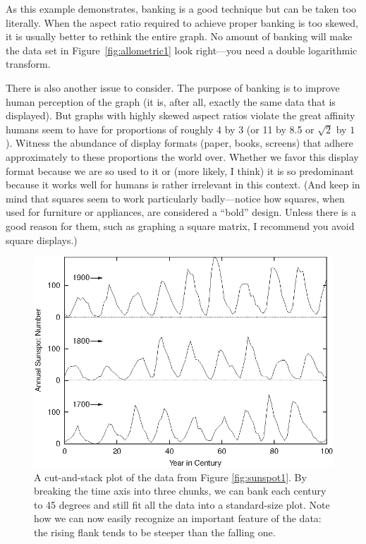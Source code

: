 As this example demonstrates, banking is a good technique but can be
taken too literally. When the aspect ratio required to achieve proper
banking is too skewed, it is usually better to rethink the entire
graph. No amount of banking will make the data set in 
Figure~\ref{fig:allometric1} look right---you need a double logarithmic
transform.

There is also another issue to consider.  The purpose of banking is to
improve human perception of the graph (it is, after all, exactly the\vadjust{\pagebreak}
same data that is displayed). But graphs with highly skewed aspect
ratios violate the great affinity humans seem to have for proportions
of roughly 4 by 3 (or 11 by 8.5 or $\sqrt{2}$ by $1$). Witness the
abundance of display formats (paper, books, screens) that adhere
approximately to these proportions the world over. Whether we favor
this display format because we are so used to it or (more likely, I
think) it is so predominant because it works well for humans is rather
irrelevant in this context. (And keep in mind that squares seem to
work particularly badly---notice how squares, when used for furniture
or appliances, are considered a ``bold'' design.  Unless there is a
good reason for them, such as graphing a square matrix, I recommend
you avoid square displays.)


\begin{figure}
  \centerline{\includegraphics{img/sunspot3}}
  \caption{A cut-and-stack plot of the data from Figure
    \ref{fig:sunspot1}.  By breaking the time axis into three chunks,
    we can bank each century to 45 degrees and still fit all the data
    into a standard-size plot.  Note how we can now easily recognize
    an important feature of the data: the rising flank tends to be
    steeper than the falling one.}
  \label{fig:sunspot3}
\end{figure}

